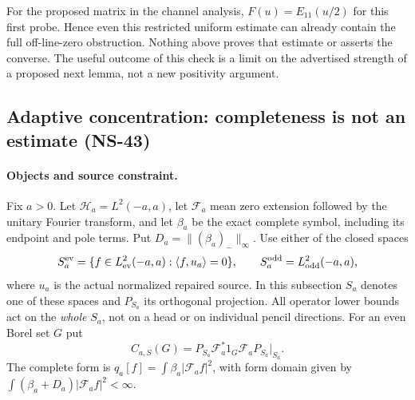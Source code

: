 \documentclass[11pt]{article}
\theoremstyle{remark}
\begin{document}
For the proposed matrix in the channel analysis, $F(u)=E_{11}(u/2)$
for this first probe. Hence even this restricted uniform estimate can
already contain the full off-line-zero obstruction. Nothing above
proves that estimate or asserts the converse. The useful outcome of
this check is a limit on the advertised strength of a proposed next
lemma, not a new positivity argument.


\subsection*{Adaptive concentration: completeness is not an estimate (NS-43)}
\label{ns43-conc-sec}

\paragraph{Objects and source constraint.}
Fix $a>0$. Let $\mathcal H_a=L^2(-a,a)$, let $\mathcal F_a$ mean
zero extension followed by the unitary Fourier transform, and let
$\beta_a$ be the exact complete symbol, including its endpoint and pole
terms. Put $D_a=\| (\beta_a)_-\|_\infty$.
Use either of the closed spaces
\[
 S_a^{\rm ev}=\{f\in L^2_{\rm ev}(-a,a):\langle f,u_a\rangle=0\},
 \qquad S_a^{\rm odd}=L^2_{\rm odd}(-a,a),
\]
where $u_a$ is the actual normalized repaired source.
In this subsection $S_a$ denotes one of these spaces and $P_{S_a}$
its orthogonal projection. All operator lower bounds act on the
\emph{whole} $S_a$, not on a head or on individual pencil directions.
For an even Borel set $G$ put
\[
 C_{a,S}(G)=P_{S_a}\mathcal F_a^*1_G\mathcal F_aP_{S_a}|_{S_a}.
\]
The complete form is
$q_a[f]=\int\beta_a|\mathcal F_af|^2$, with form domain given by
$\int(\beta_a+D_a)|\mathcal F_af|^2<\infty$.
\end{document}
